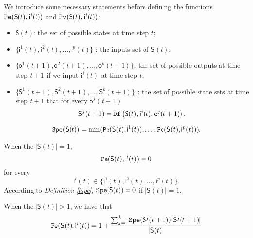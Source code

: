 We introduce some necessary statements before defining the functions ${\tt Pe}(\mathsf{S}(t),\mathsf{ i}^{i}(t))$ and ${\tt Pv}(\mathsf{S}(t),\mathsf{ i}^{i}(t))$:
\begin{itemize}
  \item $\mathsf{S}(t)$: the set of possible states at time step $t$;
  \item $\{\mathsf{ i}^{1}(t),\mathsf{ i}^{2}(t),\ldots, \mathsf{ i}^{p}(t)\}$ : the inputs set of $\mathsf{S}(t)$;
  \item $\{\mathsf{o}^1(t+1),\mathsf{o}^2(t+1),\ldots,\mathsf{o}^k(t+1)\}$: the set of possible outputs at time step $t+1$ if we input $\mathsf{ i}^{i}(t)$ at time step $t$;
 \item $\{\mathsf{S}^{1}(t+1),\mathsf{S}^{2}(t+1),\ldots, \mathsf{S}^{k}(t+1)\}$ : the set of possible state sets at time step $t+1$ that for every $\mathsf{S}^{j}(t+1)$ \[\mathsf{S}^{j}(t+1)={\tt Df}\left(\mathsf{S}(t),\mathsf{i}^{i}(t),\mathsf{o}^{j}(t+1)\right).\] 
  
\end{itemize} 
\begin{definition} \label{lspe}
\begin{equation}
\begin{split}
{\tt Spe}(\mathsf{S}(t))= \min({\tt Pe}(\mathsf{S}(t), \mathsf{ i}^{1}(t)),\ldots,{\tt Pe}(\mathsf{S}(t), \mathsf{ i}^{p}(t))).
\end{split}
\end{equation}
\end{definition}

\begin{definition} \label{spe}

When the $|\mathsf{S}(t)|=1$,
\[{\tt Pe}(\mathsf{S}(t), \mathsf{ i}^{i}(t))=0\]  for every \[\mathsf{ i}^{i}(t) \in \{\mathsf{ i}^{1}(t),\mathsf{ i}^{2}(t),\ldots, \mathsf{ i}^{p}(t)\}.\] According to {\em Definition \ref{lspe}}, ${\tt Spe}(\mathsf{S}(t))=0$ if $|\mathsf{S}(t)|=1$. 

When the $|\mathsf{S}(t)|>1$, 
we have that  
\begin{equation}
\begin{split}
{\tt Pe}(\mathsf{S}(t), \mathsf{ i}^{i}(t))=1 +\frac{\sum_{j=1}^k {\tt Spe}(\mathsf{S}^{j}(t+1))|\mathsf{S}^{j}(t+1)|}{ |\mathsf{S}(t)|}
\end{split}
\end{equation}
\end{definition}

